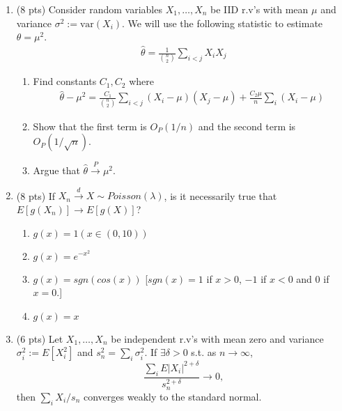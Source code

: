 \documentclass[11pt]{article}
\newcommand{\var}{\text{var}}
\begin{document}
\begin{enumerate}
\begin{enumerate}
	
\end{enumerate}
\item (8 pts) Consider random variables $X_1,\dots, X_n$ be IID r.v's with mean $\mu$ and variance $\sigma^2:=\var(X_i)$.  We will use the following statistic to estimate $\theta=\mu^2$.
\begin{align*}
\hat{\theta}=\frac{1}{{n\choose 2}}\sum_{i<j}X_iX_j
\end{align*}
\begin{enumerate}
	\item Find constants $C_1,C_2$ where 
	\begin{align*}
	\hat{\theta}-\mu^2=\frac{C_1}{{n\choose 2}}\sum_{i<j}(X_i-\mu)(X_j-\mu)+\frac{C_2\mu}{n}\sum_{i}(X_i-\mu)
	\end{align*}
	\item Show that  the first term is $O_P(1/n)$ and the second term is $O_P(1/\sqrt{n})$. %
	\item Argue that $\hat{\theta}\stackrel{P}{\rightarrow}\mu^2$.
\end{enumerate}
\item (8 pts) If $X_n\stackrel{d}{\rightarrow} X\sim Poisson(\lambda)$, is it necessarily true that $E[g(X_n)]\rightarrow E[g(X)]$?
\begin{enumerate}
	\item $g(x)=1(x\in (0,10))$
	\item $g(x)=e^{-x^2}$
	\item $g(x)=sgn(cos(x))$ [$sgn(x)=1$ if $x>0$, $-1$ if $x<0$ and $0$ if $x=0$.]
	\item $g(x)=x$
\end{enumerate}

\item (6 pts) Let $X_1,\dots, X_n$ be independent r.v's with mean zero and variance $\sigma_i^2:=E[X_i^2]$ and $s_n^2=\sum_i\sigma_i^2$. If $\exists\delta>0$ s.t. as $n\rightarrow\infty$,
$$\frac{\sum_i E|X_i|^{2+\delta}}{s_n^{2+\delta}}\rightarrow 0,$$
then $\sum_i X_i/s_n$ converges weakly to the standard normal.



\end{enumerate}
\end{document}
